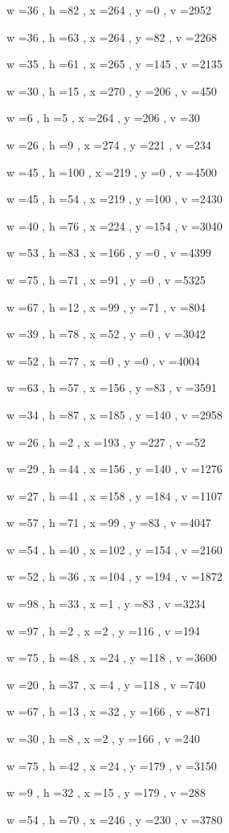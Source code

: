 \documentclass[11pt]{article}
\begin{document}
w =36 , h =82 , x =264 , y =0 , v =2952
\par
w =36 , h =63 , x =264 , y =82 , v =2268
\par
w =35 , h =61 , x =265 , y =145 , v =2135
\par
w =30 , h =15 , x =270 , y =206 , v =450
\par
w =6 , h =5 , x =264 , y =206 , v =30
\par
w =26 , h =9 , x =274 , y =221 , v =234
\par
w =45 , h =100 , x =219 , y =0 , v =4500
\par
w =45 , h =54 , x =219 , y =100 , v =2430
\par
w =40 , h =76 , x =224 , y =154 , v =3040
\par
w =53 , h =83 , x =166 , y =0 , v =4399
\par
w =75 , h =71 , x =91 , y =0 , v =5325
\par
w =67 , h =12 , x =99 , y =71 , v =804
\par
w =39 , h =78 , x =52 , y =0 , v =3042
\par
w =52 , h =77 , x =0 , y =0 , v =4004
\par
w =63 , h =57 , x =156 , y =83 , v =3591
\par
w =34 , h =87 , x =185 , y =140 , v =2958
\par
w =26 , h =2 , x =193 , y =227 , v =52
\par
w =29 , h =44 , x =156 , y =140 , v =1276
\par
w =27 , h =41 , x =158 , y =184 , v =1107
\par
w =57 , h =71 , x =99 , y =83 , v =4047
\par
w =54 , h =40 , x =102 , y =154 , v =2160
\par
w =52 , h =36 , x =104 , y =194 , v =1872
\par
w =98 , h =33 , x =1 , y =83 , v =3234
\par
w =97 , h =2 , x =2 , y =116 , v =194
\par
w =75 , h =48 , x =24 , y =118 , v =3600
\par
w =20 , h =37 , x =4 , y =118 , v =740
\par
w =67 , h =13 , x =32 , y =166 , v =871
\par
w =30 , h =8 , x =2 , y =166 , v =240
\par
w =75 , h =42 , x =24 , y =179 , v =3150
\par
w =9 , h =32 , x =15 , y =179 , v =288
\par
w =54 , h =70 , x =246 , y =230 , v =3780
\par
\end{document}
